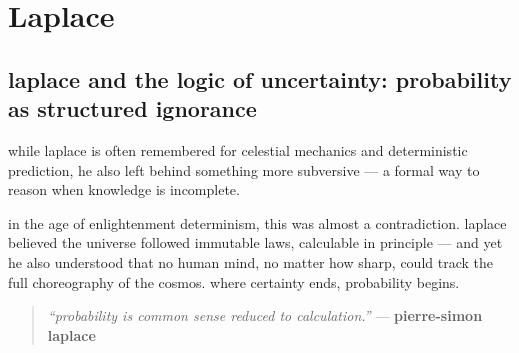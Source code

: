 \section{Laplace}

\subsection{laplace and the logic of uncertainty: probability as structured ignorance}

while laplace is often remembered for celestial mechanics and deterministic prediction, he also left behind something more subversive — a formal way to reason when knowledge is incomplete.

in the age of enlightenment determinism, this was almost a contradiction. laplace believed the universe followed immutable laws, calculable in principle — and yet he also understood that no human mind, no matter how sharp, could track the full choreography of the cosmos. where certainty ends, probability begins.

\begin{quote}
\textit{“probability is common sense reduced to calculation.”}  
— \textbf{pierre-simon laplace}
\end{quote}


